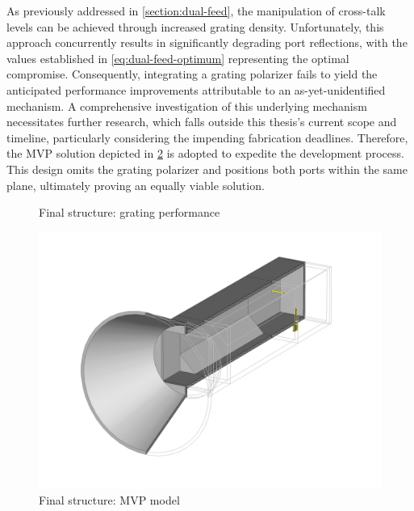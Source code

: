 \documentclass[11pt,a4paper,twoside,openany]{report}
\begin{document}
As previously addressed in \cref{section:dual-feed}, the manipulation of cross-talk levels can be achieved through increased grating density. Unfortunately, this approach concurrently results in significantly degrading port reflections, with the values established in \cref{eq:dual-feed-optimum} representing the optimal compromise. Consequently, integrating a grating polarizer fails to yield the anticipated performance improvements attributable to an as-yet-unidentified mechanism. A comprehensive investigation of this underlying mechanism necessitates further research, which falls outside this thesis's current scope and timeline, particularly considering the impending fabrication deadlines. Therefore, the MVP solution depicted in \cref{fig:final-perspective} is adopted to expedite the development process. This design omits the grating polarizer and positions both ports within the same plane, ultimately proving an equally viable solution.

\begin{figure}[!ht]
    \centering
    
    \caption{\label{fig:grating-vs-mvp-sparameters}Final structure: grating performance}
\end{figure}

%     

\begin{figure}[!ht]
    \centering
    \includegraphics[width=.8\textwidth]{src/final_perspective.png}
    \caption{\label{fig:final-perspective}Final structure: MVP model}
\end{figure}
\end{document}
